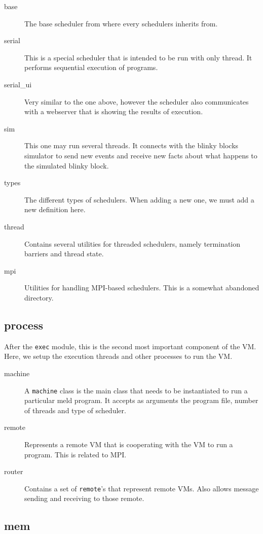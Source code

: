 \documentclass[11pt]{article}
\begin{document}
\begin{description}
   \item[base] The base scheduler from where every schedulers inherits from.
   \item[serial] This is a special scheduler that is intended to be run with only thread. It performs sequential execution of programs.
   \item[serial\_ui] Very similar to the one above, however the scheduler also communicates with a webserver that is showing the results of execution.
   \item[sim] This one may run several threads. It connects with the blinky blocks simulator to send new events and receive new facts about what happens to the simulated blinky block.
   \item[types] The different types of schedulers. When adding a new one, we must add a new definition here.
   \item[thread] Contains several utilities for threaded schedulers, namely termination barriers and thread state.
   \item[mpi] Utilities for handling MPI-based schedulers. This is a somewhat abandoned directory.
\end{description}

\subsection{process}

After the \texttt{exec} module, this is the second most important component of the VM. Here, we setup the execution threads and other processes to run the VM.

\begin{description}
   \item[machine] A \texttt{machine} class is the main class that needs to be instantiated to run a particular meld program. It accepts as arguments the program file, number of threads and type of scheduler.
   \item[remote] Represents a remote VM that is cooperating with the VM to run a program. This is related to MPI.
   \item[router] Contains a set of \texttt{remote}'s that represent remote VMs. Also allows message sending and receiving to those remote.
\end{description}

\subsection{mem}
\end{document}
